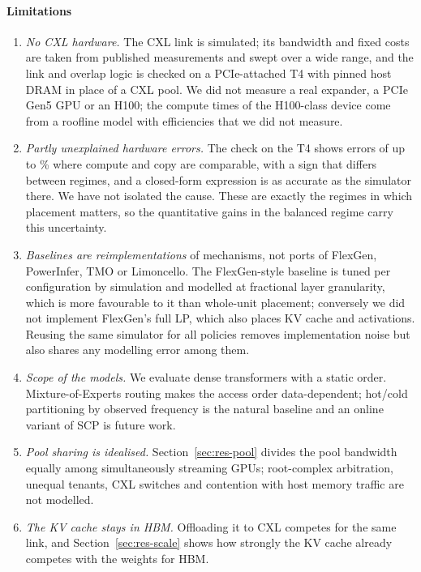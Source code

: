 \documentclass[preprint,12pt]{elsarticle}
\begin{document}
\paragraph{Limitations}
\begin{enumerate}
\item \emph{No CXL hardware.} The CXL link is simulated; its bandwidth and fixed costs are taken from published measurements \cite{yoon2025tract,jang2026itme} and swept over a wide range, and the link and overlap logic is checked on a PCIe-attached T4 with pinned host DRAM in place of a CXL pool. We did not measure a real expander, a PCIe Gen5 GPU or an H100; the compute times of the H100-class device come from a roofline model with efficiencies that we did not measure.
\item \emph{Partly unexplained hardware errors.} The check on the T4 shows errors of up to \nHwMax\% where compute and copy are comparable, with a sign that differs between regimes, and a closed-form expression is as accurate as the simulator there. We have not isolated the cause. These are exactly the regimes in which placement matters, so the quantitative gains in the balanced regime carry this uncertainty.
\item \emph{Baselines are reimplementations} of mechanisms, not ports of FlexGen, PowerInfer, TMO or Limoncello. The FlexGen-style baseline is tuned per configuration by simulation and modelled at fractional layer granularity, which is more favourable to it than whole-unit placement; conversely we did not implement FlexGen's full LP, which also places KV cache and activations. Reusing the same simulator for all policies removes implementation noise but also shares any modelling error among them.
\item \emph{Scope of the models.} We evaluate dense transformers with a static order. Mixture-of-Experts routing makes the access order data-dependent; hot/cold partitioning by observed frequency \cite{song2024powerinfer,xue2024moeinfinity} is the natural baseline and an online variant of SCP is future work.
\item \emph{Pool sharing is idealised.} Section~\ref{sec:res-pool} divides the pool bandwidth equally among simultaneously streaming GPUs; root-complex arbitration, unequal tenants, CXL switches and contention with host memory traffic are not modelled.
\item \emph{The KV cache stays in HBM.} Offloading it to CXL \cite{yoon2025tract,lee2024infinigen} competes for the same link, and Section~\ref{sec:res-scale} shows how strongly the KV cache already competes with the weights for HBM.

\end{enumerate}
\end{document}
